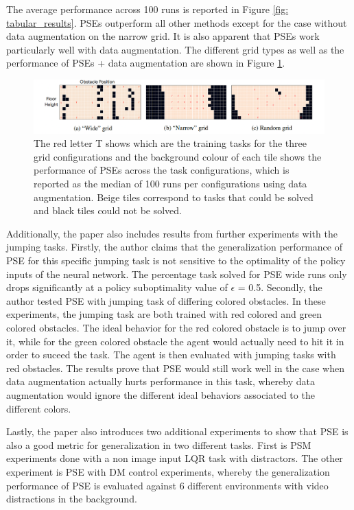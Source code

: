 \documentclass{usiinftr}
\begin{document}
The average performance across 100 runs is reported in Figure \ref{fig: tabular_results}. 
PSEs outperform all other methods except for the case without data augmentation on the narrow grid. It is also apparent that PSEs work particularly well with data augmentation.
The different grid types as well as the performance of PSEs + data augmentation are shown in Figure \ref{fig: grid_results}.

\begin{figure}[h] 
\centering
\includegraphics[width = 1\textwidth]{figures/grid_results.png}
\caption{\label{fig: grid_results}The red letter T shows which are the training tasks for the three grid configurations and the background colour of each tile shows the performance of PSEs across the task configurations, which is reported as the median of 100 runs per configurations using data augmentation. Beige tiles correspond to tasks that could be solved and black tiles could not be solved. \cite{agarwal2021contrastive}}
\end{figure}

Additionally, the paper also includes results from further experiments with the jumping tasks. Firstly, the author claims that the generalization performance of PSE for this specific jumping task is not sensitive to the optimality of the policy inputs of the neural network. The percentage task solved for PSE wide runs only drops significantly at a policy suboptimality value of $\epsilon$ = 0.5. Secondly, the author tested PSE with jumping task of differing colored obstacles. In these experiments, the jumping task are both trained with red colored and green colored obstacles. The ideal behavior for the red colored obstacle is to jump over it, while for the green colored obstacle the agent would actually need to hit it in order to suceed the task. The agent is then evaluated with jumping tasks with red obstacles. The results prove that PSE would still work well in the case when data augmentation actually hurts performance in this task, whereby data augmentation would ignore the different ideal behaviors associated to the different colors.

Lastly, the paper also introduces two additional experiments to show that PSE is also a good metric for generalization in two different tasks. First is PSM experiments done with a non image input LQR task with distractors. The other experiment is PSE with DM control experiments, whereby the generalization performance of PSE is evaluated against 6 different environments with video distractions in the background.
\end{document}
